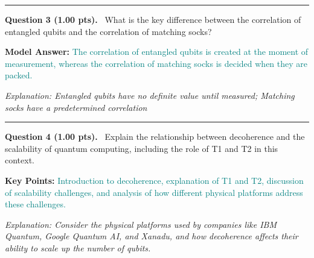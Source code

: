 \documentclass[12pt,a4paper]{article}
\begin{document}
\vspace{0.8em}
\noindent\rule{\linewidth}{0.2pt}
\vspace{0.3em}


\noindent
\textbf{Question 3 (1.00 pts).}~
What is the key difference between the correlation of entangled qubits and the correlation of matching socks?


\textbf{Model Answer:} \textcolor{teal}{The correlation of entangled qubits is created at the moment of measurement, whereas the correlation of matching socks is decided when they are packed.}



\textit{\small Explanation: Entangled qubits have no definite value until measured; Matching socks have a predetermined correlation}



\vspace{0.8em}
\noindent\rule{\linewidth}{0.2pt}
\vspace{0.3em}


\noindent
\textbf{Question 4 (1.00 pts).}~
Explain the relationship between decoherence and the scalability of quantum computing, including the role of T1 and T2 in this context.


\textbf{Key Points:} \textcolor{teal}{Introduction to decoherence, explanation of T1 and T2, discussion of scalability challenges, and analysis of how different physical platforms address these challenges.}



\textit{\small Explanation: Consider the physical platforms used by companies like IBM Quantum, Google Quantum AI, and Xanadu, and how decoherence affects their ability to scale up the number of qubits.}
\end{document}
